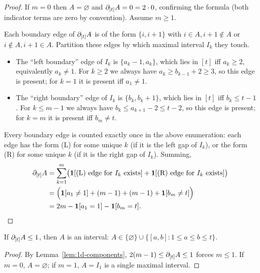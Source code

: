 \begin{proof}
If $m = 0$ then $A = \varnothing$ and $\partial_{[t]} A = 0 = 2 \cdot 0$,
confirming the formula (both indicator terms are zero by convention).
Assume $m \ge 1$.

Each boundary edge of $\partial_{[t]} A$ is of the form $\{i, i+1\}$ with
$i \in A, i+1 \notin A$ or $i \notin A, i+1 \in A$. Partition these
edges by which maximal interval $I_k$ they touch.
\begin{itemize}[nosep]
  \item[(L)] The ``left boundary'' edge of $I_k$ is $\{a_k - 1,
        a_k\}$, which lies in $[t]$ iff $a_k \ge 2$, equivalently
        $a_k \ne 1$. For $k \ge 2$ we always have $a_k \ge
        b_{k-1} + 2 \ge 3$, so this edge is present; for $k = 1$
        it is present iff $a_1 \ne 1$.
  \item[(R)] The ``right boundary'' edge of $I_k$ is $\{b_k, b_k +
        1\}$, which lies in $[t]$ iff $b_k \le t - 1$. For $k \le
        m-1$ we always have $b_k \le a_{k+1} - 2 \le t - 2$, so
        this edge is present; for $k = m$ it is present iff $b_m
        \ne t$.
\end{itemize}
Every boundary edge is counted exactly once in the above enumeration:
each edge has the form (L) for some unique $k$ (if it is the left
gap of $I_k$), or the form (R) for some unique $k$ (if it is the right
gap of $I_k$). Summing,
\begin{align*}
\partial_{[t]} A
  &= \sum_{k=1}^{m} \bigl(\mathbf{1}[\text{(L) edge for } I_k \text{ exists}] + \mathbf{1}[\text{(R) edge for } I_k \text{ exists}]\bigr)\\
  &= \Bigl(\mathbf{1}[a_1 \ne 1] + (m - 1) + (m - 1) + \mathbf{1}[b_m \ne t]\Bigr)\\
  &= 2m - \mathbf{1}[a_1 = 1] - \mathbf{1}[b_m = t]. \qedhere
\end{align*}
\end{proof}

\begin{corollary}\label{cor:1d-b-le-1}
If $\partial_{[t]} A \le 1$, then $A$ is an interval: $A \in
\{\varnothing\} \cup \{[a,b] : 1 \le a \le b \le t\}$.
\end{corollary}

\begin{proof}
By Lemma~\ref{lem:1d-components}, $2(m - 1) \le \partial_{[t]} A \le 1$
forces $m \le 1$. If $m = 0$, $A = \varnothing$; if $m = 1$, $A = I_1$
is a single maximal interval.
\end{proof}

